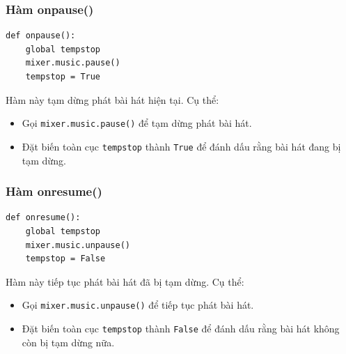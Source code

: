 \documentclass[a4paper]{article}
\begin{document}
\begin{enumerate}
\subsubsection{Hàm onpause()}
\begin{mdframed}[hidealllines=true,backgroundcolor=magenta!10]
\begin{lstlisting}
def onpause():
    global tempstop
    mixer.music.pause()
    tempstop = True
\end{lstlisting}
\end{mdframed}
Hàm này tạm dừng phát bài hát hiện tại. Cụ thể:
\begin{itemize}
    \item Gọi \texttt{mixer.music.pause()} để tạm dừng phát bài hát.
    \item Đặt biến toàn cục \texttt{tempstop} thành \texttt{True} để đánh dấu rằng bài hát đang bị tạm dừng.
\end{itemize}

\subsubsection{Hàm onresume()}
\begin{mdframed}[hidealllines=true,backgroundcolor=magenta!10]
\begin{lstlisting}
def onresume():
    global tempstop
    mixer.music.unpause()
    tempstop = False
\end{lstlisting}
\end{mdframed}
Hàm này tiếp tục phát bài hát đã bị tạm dừng. Cụ thể:
\begin{itemize}
    \item Gọi \texttt{mixer.music.unpause()} để tiếp tục phát bài hát.
    \item Đặt biến toàn cục \texttt{tempstop} thành \texttt{False} để đánh dấu rằng bài hát không còn bị tạm dừng nữa.
\end{itemize}


\end{enumerate}
\end{document}
